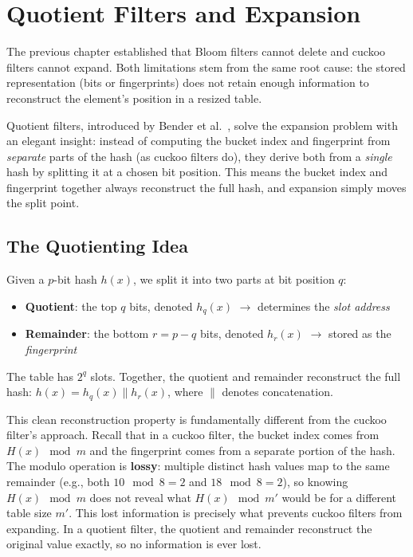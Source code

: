 \chapter{Quotient Filters and Expansion}

The previous chapter established that Bloom filters cannot delete and 
cuckoo filters cannot expand. Both limitations stem from the same root 
cause: the stored representation (bits or fingerprints) does not retain 
enough information to reconstruct the element's position in a resized 
table.

Quotient filters, introduced by Bender et al.\ \cite{quotient}, solve 
the expansion problem with an elegant insight: instead of computing the 
bucket index and fingerprint from \emph{separate} parts of the hash 
(as cuckoo filters do), they derive both from a \emph{single} hash by 
splitting it at a chosen bit position. This means the bucket index and 
fingerprint together always reconstruct the full hash, and expansion 
simply moves the split point.

\section{The Quotienting Idea}

\begin{definitionbox}[Quotienting]
Given a $p$-bit hash $h(x)$, we split it into two parts at bit position 
$q$:
\begin{itemize}
  \item \textbf{Quotient}: the top $q$ bits, denoted $h_q(x)$ 
        $\rightarrow$ determines the \emph{slot address}
  \item \textbf{Remainder}: the bottom $r = p - q$ bits, denoted $h_r(x)$ 
        $\rightarrow$ stored as the \emph{fingerprint}
\end{itemize}
The table has $2^q$ slots. Together, the quotient and remainder 
reconstruct the full hash: $h(x) = h_q(x) \| h_r(x)$, where $\|$ 
denotes concatenation.
\end{definitionbox}

This clean reconstruction property is fundamentally different from the cuckoo filter's approach. 
Recall that in a cuckoo filter, the bucket index comes from 
$H(x) \mod m$ and the fingerprint comes from a separate 
portion of the hash. The modulo operation is \textbf{lossy}: multiple 
distinct hash values map to the same remainder (e.g., both 
$10 \mod 8 = 2$ and $18 \mod 8 = 2$), so knowing 
$H(x) \mod m$ does not reveal what $H(x) \mod m'$ would be for 
a different table size $m'$. This lost information is precisely what 
prevents cuckoo filters from expanding. In a quotient filter, the quotient and remainder reconstruct the original value exactly, so no 
information is ever lost.

